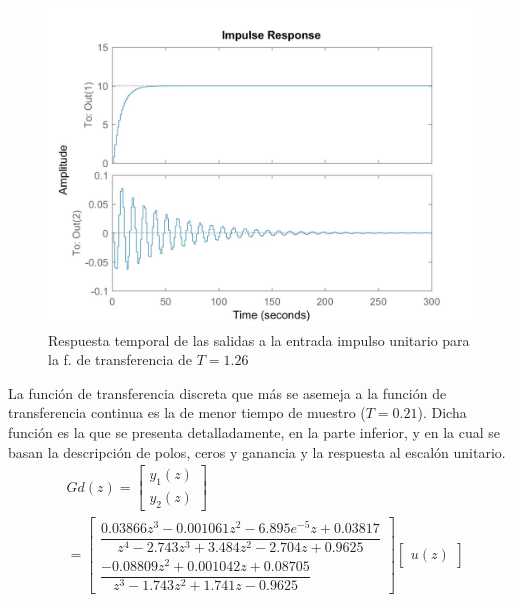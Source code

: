 \documentclass[journal]{IEEEtran}
\begin{document}
\begin{figure}[h!]
\caption{Respuesta temporal de las salidas a la entrada impulso unitario para la f. de transferencia de $T=1.26$\label{fig:impulseGd2}}
  \centering
\includegraphics[scale=0.18]{tf/impulse_Gd_2.jpg}
\end{figure}

La función de transferencia discreta que más se asemeja a la función de transferencia continua es la de menor tiempo de muestro ($T=0.21$). Dicha función es la que se presenta detalladamente, en la parte inferior, y en la cual se basan la descripción de polos, ceros y ganancia y la respuesta al escalón unitario.\\

\begin{equation}
\label{tf:Gd}
\begin{aligned}
&Gd(z) = \begin{bmatrix}
	y_1(z)\\
	y_2(z)
\end{bmatrix} \\
& = 
\begin{bmatrix}
\dfrac{0.03866 z^3 - 0.001061 z^2 - 6.895e^{-5} z + 0.03817}{z^4 - 2.743 z^3 + 3.484 z^2 - 2.704 z + 0.9625}\\
\dfrac{-0.08809 z^2 + 0.001042 z + 0.08705}{z^3 - 1.743 z^2 + 1.741 z - 0.9625}
\end{bmatrix}
\begin{bmatrix}
	u(z)
\end{bmatrix}
\end{aligned}
\end{equation}
\textbf{}
\end{document}
